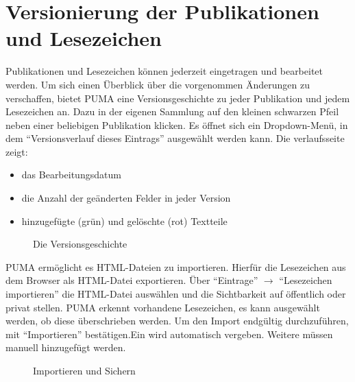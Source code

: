 \section{Versionierung der Publikationen und Lesezeichen}
\label{sec:versionierung}
Publikationen und Lesezeichen können jederzeit eingetragen und bearbeitet werden. Um sich einen Überblick über die vorgenommen Änderungen zu verschaffen, bietet PUMA eine Versionsgeschichte zu jeder Publikation und jedem Lesezeichen an. Dazu in der eigenen Sammlung auf den kleinen schwarzen Pfeil neben einer beliebigen Publikation klicken. Es öffnet sich ein Dropdown-Menü, in dem \enquote{Versionsverlauf dieses Eintrags} ausgewählt werden kann. Die verlaufsseite zeigt:
\begin {itemize}
\item das Bearbeitungsdatum
\item die Anzahl der geänderten Felder in jeder Version
\item hinzugefügte (grün) und gelöschte (rot) Textteile
\end{itemize}
\begin{figure}[h!]
 \centering
 \caption{Die Versionsgeschichte}
 \label{fig:versionsgeschichte}
\end{figure} 
PUMA ermöglicht es HTML-Dateien zu importieren. Hierfür die Lesezeichen aus dem Browser als HTML-Datei exportieren. Über \enquote{Eintrage} $\to$ \enquote{Lesezeichen importieren} die HTML-Datei auswählen und die Sichtbarkeit auf öffentlich oder privat stellen. PUMA erkennt vorhandene Lesezeichen, es kann ausgewählt werden, ob diese überschrieben werden. Um den Import endgültig durchzuführen, mit \enquote{Importieren} bestätigen.Ein \tag wird automatisch vergeben. Weitere \tags müssen manuell hinzugefügt werden. 
\begin{figure}[h!]
 \centering
 \caption{Importieren und Sichern}
 \label{fig:importierenSichern}
\end{figure}
